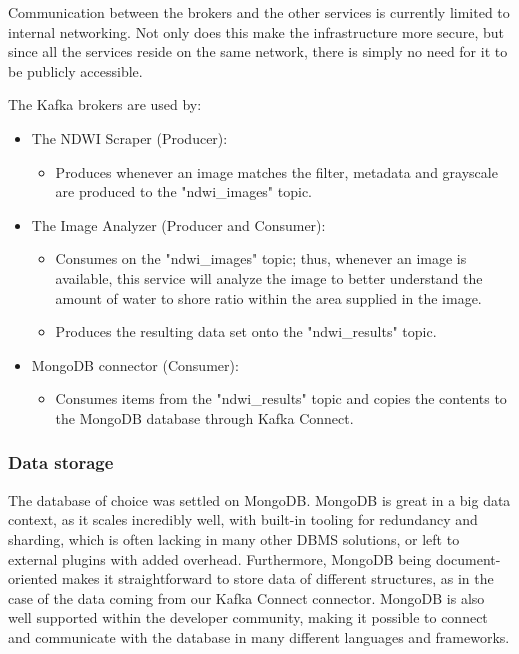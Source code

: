 Communication between the brokers and the other services is currently limited to internal networking. Not only does this make the infrastructure more secure, but since all the services reside on the same network, there is simply no need for it to be publicly accessible.

The Kafka brokers are used by:
\begin{itemize}
    \item The NDWI Scraper (Producer): 
    \begin{itemize}
        \item Produces whenever an image matches the filter, metadata and grayscale are produced to the "ndwi\_images" topic.
    \end{itemize}
    \item The Image Analyzer (Producer and Consumer): 
    \begin{itemize}
        \item Consumes on the "ndwi\_images" topic; thus, whenever an image is available, this service will analyze the image to better understand the amount of water to shore ratio within the area supplied in the image.
        \item Produces the resulting data set onto the "ndwi\_results" topic.
    \end{itemize}
    \item MongoDB connector (Consumer):
    \begin{itemize}
        \item Consumes items from the "ndwi\_results" topic and copies the contents to the MongoDB database through Kafka Connect.
    \end{itemize}
\end{itemize}

\subsubsection{Data storage}

The database of choice was settled on MongoDB. MongoDB is great in a big data context, as it scales incredibly well, with built-in tooling for redundancy and sharding, which is often lacking in many other DBMS solutions, or left to external plugins with added overhead. 
Furthermore, MongoDB being document-oriented makes it straightforward to store data of different structures, as in the case of the data coming from our Kafka Connect connector. 
MongoDB is also well supported within the developer community, making it possible to connect and communicate with the database in many different languages and frameworks. 

